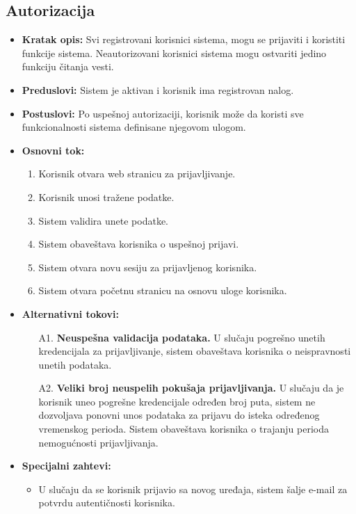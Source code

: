 \documentclass{article}
\begin{document}
\subsection{Autorizacija}
\begin{itemize}
    \item \textbf{Kratak opis:} Svi registrovani korisnici sistema, mogu se prijaviti i koristiti funkcije sistema. Neautorizovani korisnici sistema mogu ostvariti jedino funkciju čitanja vesti.
    \item \textbf{Preduslovi:} Sistem je aktivan i korisnik ima registrovan nalog.
    \item \textbf{Postuslovi:} Po uspešnoj autorizaciji, korisnik može da koristi sve funkcionalnosti sistema definisane njegovom ulogom.
    \item \textbf{Osnovni tok:}
        \begin{enumerate}
            \item Korisnik otvara web stranicu za prijavljivanje.
            \item Korisnik unosi tražene podatke.
            \item Sistem validira unete podatke.
            \item Sistem obaveštava korisnika o uspešnoj prijavi.
            \item Sistem otvara novu sesiju za prijavljenog korisnika.
            \item Sistem otvara početnu stranicu na osnovu uloge korisnika.
	    \end{enumerate}
    \item \textbf{Alternativni tokovi:}
        \begin{itemize}
            \item[A1.] \textbf{Neuspešna validacija podataka.} U slučaju pogrešno unetih kredencijala za prijavljivanje, sistem obaveštava korisnika o neispravnosti unetih podataka.
            \item[A2.] \textbf{Veliki broj neuspelih pokušaja prijavljivanja.} U slučaju da je korisnik uneo pogrešne kredencijale određen broj puta, sistem ne dozvoljava ponovni unos podataka za prijavu do isteka određenog vremenskog perioda. Sistem obaveštava korisnika o trajanju perioda nemogućnosti prijavljivanja.
        \end{itemize}
    \item \textbf{Specijalni zahtevi:}
        \begin{itemize}
			\item U slučaju da se korisnik prijavio sa novog uređaja, sistem šalje e-mail za potvrdu autentičnosti korisnika.

\end{itemize}
\end{itemize}
\end{document}
